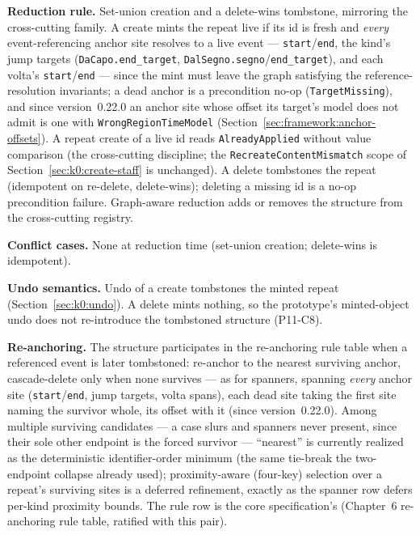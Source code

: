 \documentclass[11pt,letterpaper]{report}
\begin{document}
\textbf{Reduction rule.} Set-union creation and a delete-wins tombstone,
mirroring the cross-cutting family. A create mints the repeat live if its
id is fresh and \emph{every} event-referencing anchor site resolves to a
live event --- \texttt{start}/\texttt{end}, the kind's jump targets
(\texttt{DaCapo.end\_target},
\texttt{DalSegno.segno}/\texttt{end\_target}), and each volta's
\texttt{start}/\texttt{end} --- since the mint must leave the graph
satisfying the reference-resolution invariants; a dead anchor is a
precondition no-op (\texttt{TargetMissing}), and since version~0.22.0 an anchor
site whose offset its target's model does not admit is one with
\texttt{WrongRegionTimeModel} (Section~\ref{sec:framework:anchor-offsets}). A
repeat create of a live id
reads \texttt{AlreadyApplied} without value comparison (the cross-cutting
discipline; the \texttt{RecreateContentMismatch} scope of
Section~\ref{sec:k0:create-staff} is unchanged). A delete tombstones the
repeat (idempotent on re-delete, delete-wins); deleting a missing id is a
no-op precondition failure. Graph-aware reduction adds or removes the
structure from the cross-cutting registry.

\textbf{Conflict cases.} None at reduction time (set-union creation;
delete-wins is idempotent).

\textbf{Undo semantics.} Undo of a create tombstones the minted repeat
(Section~\ref{sec:k0:undo}). A delete mints nothing, so the prototype's
minted-object undo does not re-introduce the tombstoned structure
(P11-C8).

\textbf{Re-anchoring.} The structure participates in the re-anchoring rule
table when a referenced event is later tombstoned: re-anchor to the
nearest surviving anchor, cascade-delete only when none survives --- as
for spanners, spanning \emph{every} anchor site
(\texttt{start}/\texttt{end}, jump targets, volta spans), each dead site
taking the first site naming the survivor whole, its offset with it (since
version~0.22.0). Among multiple
surviving candidates --- a case slurs and spanners never present, since
their sole other endpoint is the forced survivor --- ``nearest'' is
currently realized as the deterministic identifier-order minimum (the
same tie-break the two-endpoint collapse already used); proximity-aware
(four-key) selection over a repeat's surviving sites is a deferred
refinement, exactly as the spanner row defers per-kind proximity bounds.
The rule row is the core specification's (Chapter~6 re-anchoring rule
table, ratified with this pair).
\end{document}
